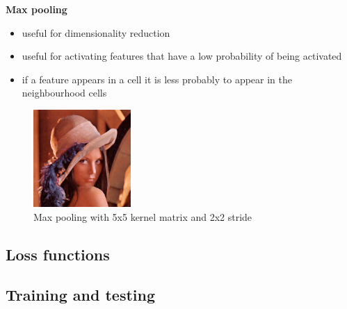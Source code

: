 \textbf{Max pooling}

\begin{itemize}
	\item{useful for dimensionality reduction}
	\item{useful for activating features that have a low probability of being activated\cite{maxpooling}}
	\item{if a feature appears in a cell it is less probably to appear in the neighbourhood cells}
\end{itemize}

\begin{figure}[h]
	\begin{center}
		\includegraphics[width=140px,height=140px]{src/img/state/lena-maxpooling}
		\caption{Max pooling with 5x5 kernel matrix and 2x2 stride} \label{fig:lena-avgpooling}
    \end{center}
\end{figure}



\subsection{Loss functions}
\label{loss}

\subsection{Training and testing}
\label{train-test}


